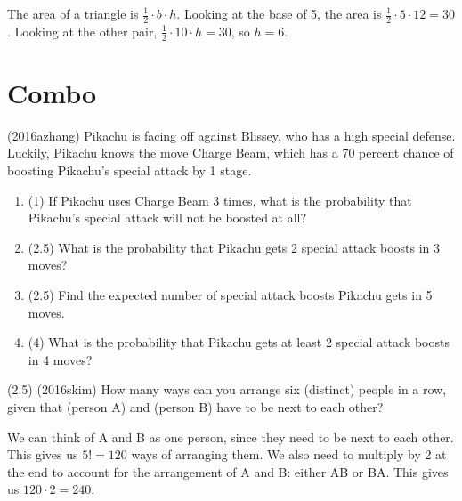 \documentclass[11pt]{article}
\begin{document}
\begin{solution}
The area of a triangle is $\frac{1}{2} \cdot b \cdot h$. Looking at the base of 5, the area is
$\frac{1}{2} \cdot 5 \cdot 12 = 30$. Looking at the other pair, $\frac{1}{2} \cdot 10 \cdot h = 30$, so $h = 6$.
\end{solution}

\section{Combo}
\begin{problem}
(2016azhang) Pikachu is facing off against Blissey, who has a high special defense. Luckily, Pikachu knows the move Charge Beam, which has a 70 percent chance of boosting Pikachu's special attack by 1 stage. 

\begin{enumerate}
\item (1) If Pikachu uses Charge Beam 3 times, what is the probability that Pikachu's special attack will not be boosted at all?
\item (2.5) What is the probability that Pikachu gets 2 special attack boosts in 3 moves? 
\item (2.5) Find the expected number of special attack boosts Pikachu gets in 5 moves.
\item (4) What is the probability that Pikachu gets at least 2 special attack boosts in 4 moves?
\end{enumerate}
\end{problem}

\begin{problem}
\item (2.5) (2016skim) How many ways can you arrange six (distinct) people in a row, given that (person A) and (person B) have to be next to each other?
\end{problem}

\begin{answer}
\end{answer}

\begin{solution}
We can think of A and B as one person, since they need to be next to each other. This gives us $5! = 120$ ways of arranging them. We also need to multiply by 2 at the end to account for the arrangement of A and B: either AB or BA. This gives us $120\cdot2 = 240$.
\end{solution}
\end{document}
